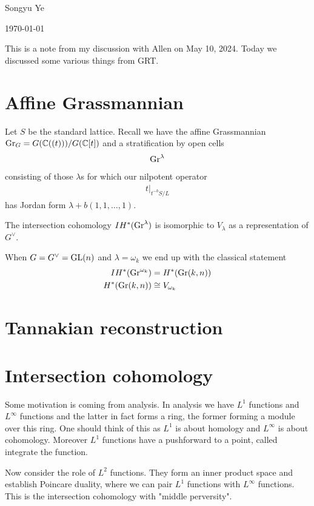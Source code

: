 \documentclass[12pt]{article}
\begin{document}
Songyu Ye

\today

This is a note from my discussion with Allen on May 10, 2024. Today we 
discussed some various things from GRT.

\section{Affine Grassmannian}
Let $S$ be the standard lattice.
Recall we have the affine Grassmannian $\operatorname{Gr}_G = G(\mathbb{C}((t)))/G(\mathbb{C}[t])$ and a
stratification by open cells \begin{align*}
    \operatorname{Gr}^\lambda
\end{align*} consisting of those $\lambda$s for which our nilpotent operator \begin{align*}
    t\vert_{t^{-b}S/L}
\end{align*} has Jordan form $\lambda + b(1, 1, \ldots, 1)$.

\begin{theorem}
    [Lusztig] The intersection cohomology $IH^*(\operatorname{Gr}^\lambda)$ is isomorphic to $V_\lambda$
    as a representation of $G^\vee$.
\end{theorem}

\begin{example}
    When $G = G^\vee = \operatorname{GL}(n)$ and $\lambda = \omega_k$ we end up with the 
    classical statement \begin{align*}
        IH^*(\operatorname{Gr}^{\omega_k}) &= H^*(\operatorname{Gr}(k,n)) \\
        H^*(\operatorname{Gr}(k,n)) &\cong V_{\omega_k}
    \end{align*}
\end{example}
\section{Tannakian reconstruction}

\section{Intersection cohomology}
Some motivation is coming from analysis. In analysis we have $L^1$ functions and
$L^\infty$ functions and the latter in fact forms a ring, the former forming a 
module over this ring. One should think of this as $L^1$ is about 
homology and $L^\infty$ is about cohomology. Moreover $L^1$ functions have a pushforward to a
point, called integrate the function. 

\hfill

Now consider the role of $L^2$ functions. They form an inner product space and establish
Poincare duality, where we can pair $L^1$ functions with $L^\infty$ functions.
This is the intersection cohomology with "middle perversity".
\end{document}
